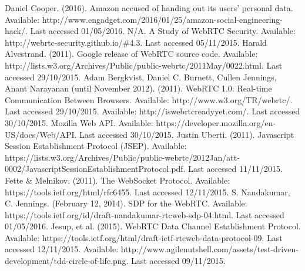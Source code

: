 \documentclass[]{report}
\begin{document}
\begin{thebibliography}{20}
		Daniel Cooper. (2016). Amazon accused of handing out its users' personal data. Available: http://www.engadget.com/2016/01/25/amazon-social-engineering-hack/. Last accessed 01/05/2016.
		N/A. A Study of WebRTC Security. Available: http://webrtc-security.github.io/\#4.3. Last accessed 05/11/2015.
		Harald Alvestrand. (2011). Google release of WebRTC source code. Available: http://lists.w3.org/Archives/Public/public-webrtc/2011May/0022.html. Last accessed 29/10/2015.
		Adam Bergkvist, Daniel C. Burnett, Cullen Jennings, Anant Narayanan (until November 2012). (2011). WebRTC 1.0: Real-time Communication Between Browsers. Available: http://www.w3.org/TR/webrtc/. Last accessed 29/10/2015.
		Available: http://iswebrtcreadyyet.com/. Last accessed 30/10/2015.
		Mozilla Web API. Available: https://developer.mozilla.org/en-US/docs/Web/API. Last accessed 30/10/2015.
		Justin Uberti. (2011). Javascript Session Establishment Protocol (JSEP). Available: https://lists.w3.org/Archives/Public/public-webrtc/2012Jan/att-0002/JavascriptSessionEstablishmentProtocol.pdf. Last accessed 11/11/2015.
		Fette \& Melnikov. (2011). The WebSocket Protocol. Available: https://tools.ietf.org/html/rfc6455. Last accessed 12/11/2015.
		S. Nandakumar, C. Jennings. (February 12, 2014). SDP for the WebRTC. Available: https://tools.ietf.org/id/draft-nandakumar-rtcweb-sdp-04.html. Last accessed 01/05/2016.
		Jesup, et al. (2015). WebRTC Data Channel Establishment Protocol. Available: https://tools.ietf.org/html/draft-ietf-rtcweb-data-protocol-09. Last accessed 12/11/2015.
		Available: http://www.agilenutshell.com/assets/test-driven-development/tdd-circle-of-life.png. Last accessed 09/11/2015.
	\end{thebibliography}
\end{document}
